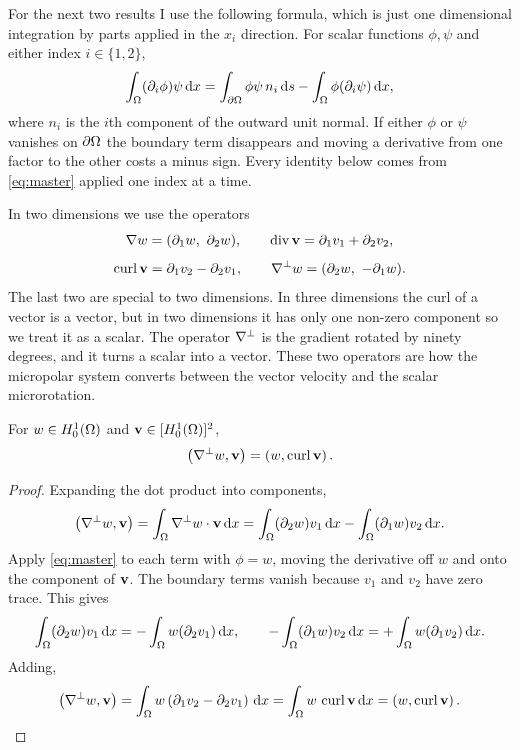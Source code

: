 \documentclass[11pt,a4paper]{article}
\begin{document}
For the next two results I use the following formula, which is just one
dimensional integration by parts applied in the $x_{i}$ direction. For scalar
functions $\phi, \psi$ and either index $i \in \{1,2\}$,
\begin{equation}\label{eq:master}
  \int_\Omega (\partial_{i}\phi)\psi \,\mathrm{d}x
  = \int_{\partial\Omega} \phi \psi\, n_{i} \,\mathrm{d}s - \int_\Omega \phi (\partial_{i}\psi) \,\mathrm{d}x ,
\end{equation}
where $n_{i}$ is the $i$th component of the outward unit normal. If either
$\phi$ or $\psi$ vanishes on $\partial\Omega$ the boundary term disappears and moving a
derivative from one factor to the other costs a minus sign. Every identity
below comes from \eqref{eq:master} applied one index at a time.

In two dimensions we use the operators
\[
  \nabla w = (\partial_{1}w,\ \partial_{2}w),
  \qquad
  \operatorname{div} \mathbf{v} = \partial_{1}v_{1} + \partial_{2}v_{2},
\]
\[
  \operatorname{curl} \mathbf{v} = \partial_{1}v_{2} - \partial_{2}v_{1},
  \qquad
  \nabla^{\perp} w = (\partial_{2}w,\ -\partial_{1}w).
\]
The last two are special to two dimensions. In three dimensions the curl of a
vector is a vector, but in two dimensions it has only one non-zero component so
we treat it as a scalar. The operator $\nabla^{\perp}$ is the gradient rotated
by ninety degrees, and it turns a scalar into a vector. These two operators are
how the micropolar system converts between the vector velocity and the scalar
microrotation.

\begin{lemma}\label{lem:rot}
For $w \in H^{1}_{0}(\Omega)$ and $\mathbf{v} \in [H^{1}_{0}(\Omega)]^{2}$,
\[
  \left( \nabla^{\perp} w , \mathbf{v} \right) = \left( w , \operatorname{curl} \mathbf{v} \right).
\]
\end{lemma}

\begin{proof}
Expanding the dot product into components,
\[
  \left( \nabla^{\perp} w , \mathbf{v} \right)
  = \int_\Omega \nabla^{\perp} w \cdot \mathbf{v} \,\mathrm{d}x
  = \int_\Omega (\partial_{2}w) v_{1} \,\mathrm{d}x - \int_\Omega (\partial_{1}w) v_{2} \,\mathrm{d}x .
\]
Apply \eqref{eq:master} to each term with $\phi = w$, moving the derivative off
$w$ and onto the component of $\mathbf{v}$. The boundary terms vanish because $v_{1}$
and $v_{2}$ have zero trace. This gives
\[
  \int_\Omega (\partial_{2}w) v_{1} \,\mathrm{d}x = - \int_\Omega w (\partial_{2}v_{1}) \,\mathrm{d}x,
  \qquad
  - \int_\Omega (\partial_{1}w) v_{2} \,\mathrm{d}x = + \int_\Omega w (\partial_{1}v_{2}) \,\mathrm{d}x .
\]
Adding,
\[
  \left( \nabla^{\perp} w , \mathbf{v} \right)
  = \int_\Omega w \left( \partial_{1}v_{2} - \partial_{2}v_{1} \right) \,\mathrm{d}x
  = \int_\Omega w \,\operatorname{curl} \mathbf{v} \,\mathrm{d}x
  = \left( w , \operatorname{curl} \mathbf{v} \right). \qedhere
\]
\end{proof}
\end{document}
